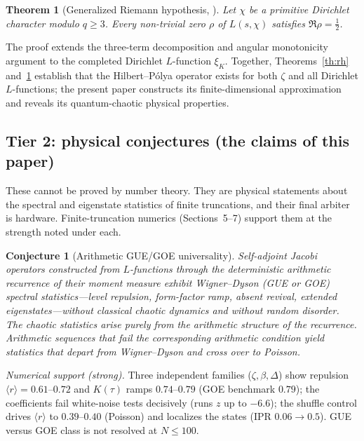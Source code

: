 \documentclass[aps,prx,reprint,floatfix]{revtex4-2}
\newtheorem{theorem}{Theorem}
\newtheorem{conjecture}{Conjecture}
\begin{document}
\begin{theorem}[Generalized Riemann hypothesis, \cite{chen2026grh}]
\label{th:grh}
Let $\chi$ be a primitive Dirichlet character modulo $q\ge3$. Every
non-trivial zero $\rho$ of $L(s,\chi)$ satisfies $\Re\rho=\tfrac{1}{2}$.
\end{theorem}

\noindent The proof extends the three-term decomposition and angular
monotonicity argument to the completed Dirichlet $L$-function $\xi_K$.
Together, Theorems~\ref{th:rh} and~\ref{th:grh} establish that the
Hilbert--P\'olya operator exists for both $\zeta$ and all Dirichlet
$L$-functions; the present paper constructs its finite-dimensional
approximation and reveals its quantum-chaotic physical properties.

\subsection{Tier 2: physical conjectures (the claims of this paper)}

These cannot be proved by number theory. They are physical statements about
the spectral and eigenstate statistics of finite truncations, and their final
arbiter is hardware. Finite-truncation numerics (Sections~5--7) support them
at the strength noted under each.

\begin{conjecture}[Arithmetic GUE/GOE universality]
\label{conj:gue}
Self-adjoint Jacobi operators constructed from $L$-functions through the
deterministic arithmetic recurrence of their moment measure exhibit
Wigner--Dyson (GUE or GOE) spectral statistics---level repulsion, form-factor
ramp, absent revival, extended eigenstates---without classical chaotic
dynamics and without random disorder. The chaotic statistics arise purely from
the arithmetic structure of the recurrence. Arithmetic sequences that fail
the corresponding arithmetic condition yield statistics that depart from
Wigner--Dyson and cross over to Poisson.
\end{conjecture}
\noindent\emph{Numerical support (strong).} Three independent families
($\zeta,\beta,\Delta$) show repulsion $\langle r\rangle=0.61$--$0.72$
and $K(\tau)$ ramps $0.74$--$0.79$ (GOE benchmark $0.79$); the coefficients
fail white-noise tests decisively (runs $z$ up to $-6.6$); the shuffle control
drives $\langle r\rangle$ to $0.39$--$0.40$ (Poisson) and localizes the states
(IPR $0.06\to0.5$). GUE versus GOE class is not resolved at $N\le100$.
\end{document}
